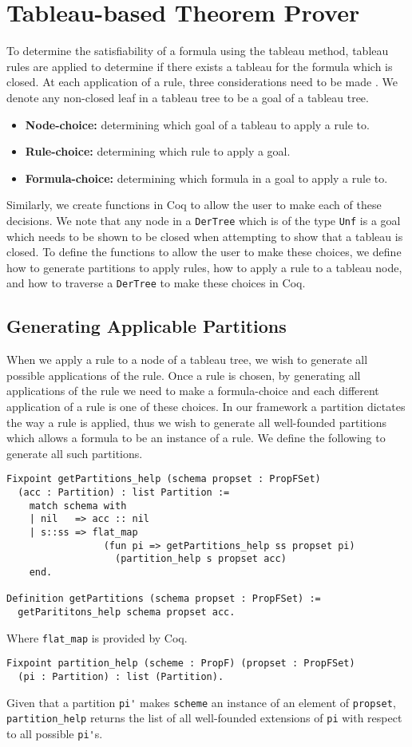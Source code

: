 \documentclass{llncs}
\begin{document}
\section{Tableau-based Theorem Prover}\label{Tableau-based Theorem Prover}
%
To determine the satisfiability of a formula using the tableau method, tableau
rules are applied to determine if there exists a tableau for the formula which
is closed. At each application of a rule, three considerations need to be made
\cite{abate2007tableau, kelly2009revised}. We denote any non-closed leaf in a
tableau tree to be a goal of a tableau tree.
%
\begin{itemize}
\item \textbf{Node-choice:} determining which goal of a tableau to apply a rule
to.
\item \textbf{Rule-choice:} determining which rule to apply a goal.
\item \textbf{Formula-choice:} determining which formula in a goal to apply
a rule to.
\end{itemize}
%
Similarly, we create functions in Coq to allow the user to make each of these
decisions. We note that any node in a \verb+DerTree+ which is of the type
\verb+Unf+ is a goal which needs to be shown to be closed when attempting to
show that a tableau is closed. To define the functions to allow the user to
make these choices, we define how to generate partitions to apply rules, how to
apply a rule to a tableau node, and how to traverse a \verb+DerTree+ to make
these choices in Coq.
%
\subsection{Generating Applicable Partitions}
%
When we apply a rule to a node of a tableau tree, we wish to generate all
possible applications of the rule. Once a rule is chosen, by generating all
applications of the rule we need to make a formula-choice and each different
application of a rule is one of these choices. In our framework a partition
dictates the way a rule is applied, thus we wish to generate all well-founded
partitions which allows a formula to be an instance of a rule. We define the
following to generate all such partitions.
%
\begin{verbatim}
Fixpoint getPartitions_help (schema propset : PropFSet)
  (acc : Partition) : list Partition :=
    match schema with
    | nil   => acc :: nil
    | s::ss => flat_map
                 (fun pi => getPartitions_help ss propset pi) 
                   (partition_help s propset acc)
    end.

Definition getPartitions (schema propset : PropFSet) :=
  getParititons_help schema propset acc.
\end{verbatim}
%
Where \verb+flat_map+ is provided by Coq.
%
\begin{verbatim}
Fixpoint partition_help (scheme : PropF) (propset : PropFSet)
  (pi : Partition) : list (Partition).
\end{verbatim}
%
Given that a partition \verb+pi'+ makes \verb+scheme+ an instance of an element
of \verb+propset+, \verb+partition_help+ returns the list of all well-founded
extensions of \verb+pi+ with respect to all possible \verb+pi'+s.
\end{document}
